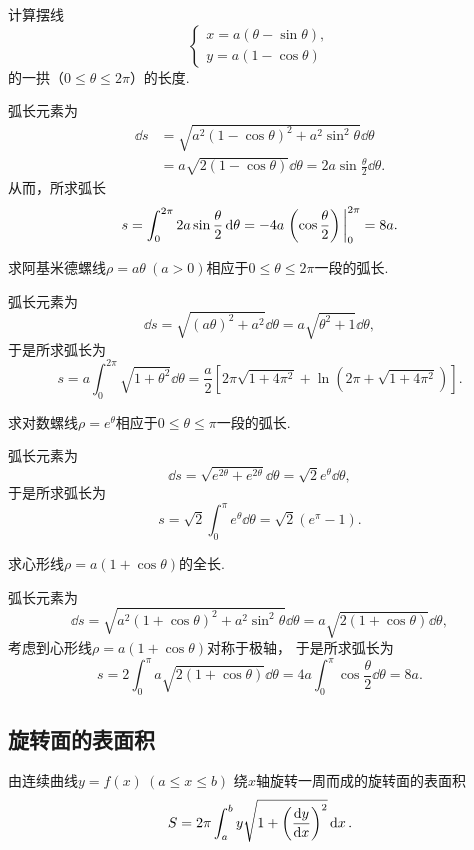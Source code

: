 \begin{example}
计算摆线\[
	\left\{ \begin{array}{l}
		x = a (\theta - \sin\theta), \\
		y = a (1 - \cos\theta)
	\end{array} \right.
\]的一拱（\(0 \leq \theta \leq 2\pi\)）的长度.
\begin{solution}
弧长元素为\begin{align*}
	\dd{s} &= \sqrt{a^2 (1 - \cos\theta)^2 + a^2 \sin^2\theta} \dd{\theta} \\
	&= a \sqrt{2 (1 - \cos\theta)} \dd{\theta}
	= 2 a \sin\frac\theta2 \dd{\theta}.
\end{align*}
从而，所求弧长\[
	s = \int_0^{2\pi} 2a \sin\frac\theta2 \dd{\theta}
	= -4a \eval{\left(\cos\frac\theta2\right)}_0^{2\pi}
	= 8a.
\]
\end{solution}
\end{example}

\begin{example}
求阿基米德螺线\(\rho=a\theta\ (a>0)\)相应于\(0\leq\theta\leq2\pi\)一段的弧长.
\begin{solution}
弧长元素为\[
	\dd{s} = \sqrt{(a\theta)^2 + a^2} \dd{\theta}
	= a\sqrt{\theta^2+1} \dd{\theta},
\]
于是所求弧长为\[
	s = a \int_0^{2\pi} \sqrt{1+\theta^2} \dd{\theta}
	= \frac{a}{2} \left[
	2\pi\sqrt{1+4\pi^2} + \ln(2\pi+\sqrt{1+4\pi^2})
	\right].
\]
\end{solution}
\end{example}

\begin{example}
求对数螺线\(\rho=e^{\theta}\)相应于\(0\leq\theta\leq\pi\)一段的弧长.
\begin{solution}
弧长元素为\[
	\dd{s} = \sqrt{e^{2\theta}+e^{2\theta}} \dd{\theta}
	= \sqrt{2}e^{\theta} \dd{\theta},
\]
于是所求弧长为\[
	s = \sqrt{2} \int_0^\pi e^{\theta} \dd{\theta}
	= \sqrt{2} (e^\pi-1).
\]
\end{solution}
\end{example}

\begin{example}
求心形线\(\rho=a(1+\cos\theta)\)的全长.
\begin{solution}
弧长元素为\[
	\dd{s} = \sqrt{a^2(1+\cos\theta)^2+a^2\sin^2\theta} \dd{\theta}
	= a \sqrt{2(1+\cos\theta)} \dd{\theta},
\]
考虑到心形线\(\rho=a(1+\cos\theta)\)对称于极轴，
于是所求弧长为\[
	s = 2 \int_0^\pi a \sqrt{2(1+\cos\theta)} \dd{\theta}
	= 4a \int_0^\pi \cos\frac\theta2 \dd{\theta}
	= 8a.
\]
\end{solution}
\end{example}

\subsection{旋转面的表面积}
\begin{theorem}[古尔丁表面积定理]
由连续曲线\(y=f(x)\ (a \leq x \leq b)\)
绕\(x\)轴旋转一周而成的旋转面的表面积\begin{equation}
	S = 2\pi \int_a^b y \sqrt{1+\left(\dv{y}{x}\right)^2} \dd{x}.
\end{equation}
\end{theorem}
